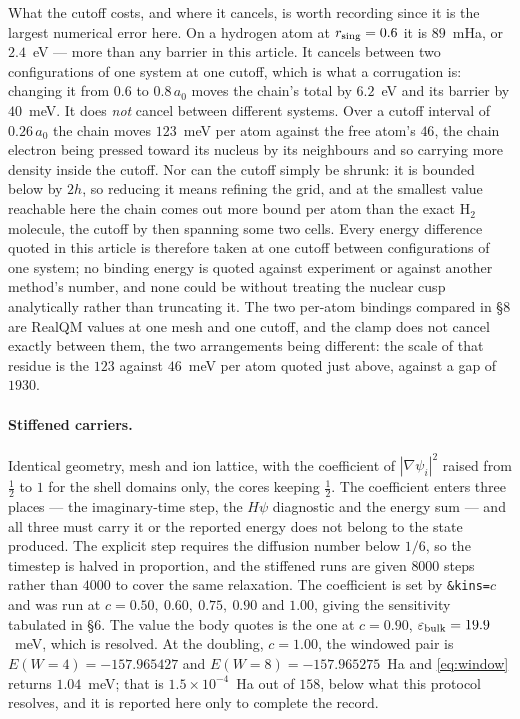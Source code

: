 \documentclass[11pt]{article}
\newcommand{\grad}{\nabla}
\newcommand{\half}{\tfrac12}
\begin{document}
What the cutoff costs, and where it cancels, is worth recording since it is the largest numerical
error here. On a hydrogen atom at $r_{\rm sing}=0.6$ it is $89$~mHa, or $2.4$~eV --- more than any
barrier in this article. It cancels between two configurations of one system at one cutoff, which is
what a corrugation is: changing it from $0.6$ to $0.8\,a_0$ moves the chain's total by $6.2$~eV and
its barrier by $40$~meV. It does \emph{not} cancel between different systems. Over a cutoff interval
of $0.26\,a_0$ the chain moves $123$~meV per atom against the free atom's $46$, the chain electron
being pressed toward its nucleus by its neighbours and so carrying more density inside the cutoff.
Nor can the cutoff simply be shrunk: it is bounded below by $2h$, so reducing it means refining the
grid, and at the smallest value reachable here the chain comes out more bound per atom than the
exact H$_2$ molecule, the cutoff by then spanning some two cells. Every energy difference quoted in
this article is therefore taken at one cutoff between configurations of one system; no binding
energy is quoted against experiment or against another method's number, and none could be without
treating the nuclear cusp analytically rather than truncating it. The two per-atom bindings compared
in \S8 are RealQM values at one mesh and one cutoff, and the clamp does not cancel exactly between
them, the two arrangements being different: the scale of that residue is the $123$ against
$46$~meV per atom quoted just above, against a gap of $1930$.
\paragraph{Stiffened carriers.} Identical geometry, mesh and ion lattice, with the coefficient of
$|\grad\psi_i|^2$ raised from $\half$ to $1$ for the shell domains only, the cores keeping $\half$.
The coefficient enters three places --- the imaginary-time step, the $H\psi$ diagnostic and the
energy sum --- and all three must carry it or the reported energy does not belong to the state
produced. The explicit step requires the diffusion number below $1/6$, so the timestep is halved in
proportion, and the stiffened runs are given $8000$ steps rather than $4000$ to cover the same
relaxation. The coefficient is set by \texttt{\&kins=}$c$ and was run at
$c=0.50,\ 0.60,\ 0.75,\ 0.90$ and $1.00$, giving the sensitivity tabulated in \S6. The value the
body quotes is the one at $c=0.90$, $\varepsilon_{\rm bulk}=19.9$~meV, which is resolved. At the
doubling, $c=1.00$, the windowed pair is $E(W{=}4)=-157.965427$ and $E(W{=}8)=-157.965275$~Ha and
\eqref{eq:window} returns $1.04$~meV; that is $1.5\times10^{-4}$~Ha out of $158$, below what this
protocol resolves, and it is reported here only to complete the record.
\end{document}
